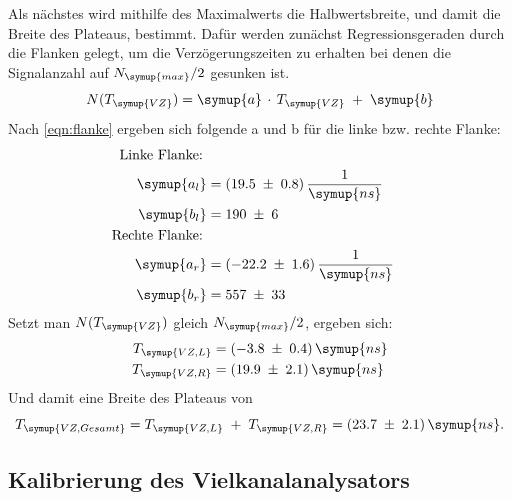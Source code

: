 \noindent
Als nächstes wird mithilfe des
Maximalwerts die Halbwertsbreite, und damit die Breite des Plateaus, bestimmt.
Dafür werden zunächst Regressionsgeraden durch die Flanken gelegt, um die Verzögerungszeiten
zu erhalten bei denen die Signalanzahl auf $N_{\symup{max}}/2$ gesunken ist.
\begin{equation}
  N(T_{\symup{VZ}}) = \symup{a}\,\cdot\,T_{\symup{VZ}}\;+\;\symup{b}
  \label{eqn:flanke}
\end{equation}
Nach \ref{eqn:flanke} ergeben sich folgende a und b für die linke bzw. rechte Flanke:
\begin{align*}
  \text{Linke Flanke:\;}\\
  \symup{a_l} &= (19.5\;\pm\;0.8)\,\frac{1}{\symup{ns}}\\
  \symup{b_l} &= 190\;\pm\;6\\
  \text{Rechte Flanke:\;}\\
  \symup{a_r} &= (-22.2\;\pm\;1.6)\,\frac{1}{\symup{ns}}\\
  \symup{b_r} &= 557\;\pm\;33\\
\end{align*}
Setzt man $N(T_{\symup{VZ}})$ gleich $N_{\symup{max}}/2$, ergeben sich:
\begin{align*}
  T_{\symup{VZ,L}} &= (-3.8\;\pm\;0.4)\,\symup{ns}\\
  T_{\symup{VZ,R}} &= (19.9\;\pm\;2.1)\,\symup{ns}\\
\end{align*}
Und damit eine Breite des Plateaus von
\begin{equation*}
  T_{\symup{VZ,Gesamt}} = T_{\symup{VZ,L}}\;+\;T_{\symup{VZ,R}} = (23.7\;\pm\;2.1)\,\symup{ns}.
\end{equation*}

\subsection{Kalibrierung des Vielkanalanalysators}
\label{sec:vielkanalanalysator}

